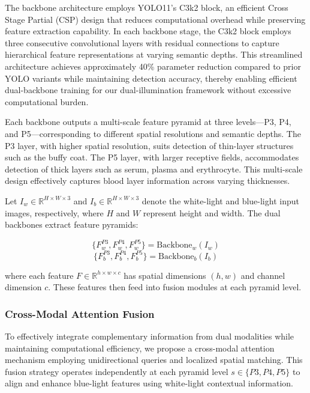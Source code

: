 The backbone architecture employs YOLO11's C3k2 block, an efficient Cross Stage Partial (CSP) design that reduces computational overhead while preserving feature extraction capability. In each backbone stage, the C3k2 block employs three consecutive convolutional layers with residual connections to capture hierarchical feature representations at varying semantic depths. This streamlined architecture achieves approximately 40\% parameter reduction compared to prior YOLO variants while maintaining detection accuracy, thereby enabling efficient dual-backbone training for our dual-illumination framework without excessive computational burden.

Each backbone outputs a multi-scale feature pyramid at three levels—P3, P4, and P5—corresponding to different spatial resolutions and semantic depths. The P3 layer, with higher spatial resolution, suits detection of thin-layer structures such as the buffy coat. The P5 layer, with larger receptive fields, accommodates detection of thick layers such as serum, plasma and erythrocyte. This multi-scale design effectively captures blood layer information across varying thicknesses.

Let $I_w \in \mathbb{R}^{H \times W \times 3}$ and $I_b \in \mathbb{R}^{H \times W \times 3}$ denote the white-light and blue-light input images, respectively, where $H$ and $W$ represent height and width. The dual backbones extract feature pyramids:

\begin{equation}
\{F_w^{P3}, F_w^{P4}, F_w^{P5}\} = \text{Backbone}_w(I_w)
\end{equation}
\begin{equation}
\{F_b^{P3}, F_b^{P4}, F_b^{P5}\} = \text{Backbone}_b(I_b)
\end{equation}

where each feature $F \in \mathbb{R}^{h \times w \times c}$ has spatial dimensions $(h, w)$ and channel dimension $c$. These features then feed into fusion modules at each pyramid level.

\subsubsection{Cross-Modal Attention Fusion}

To effectively integrate complementary information from dual modalities while maintaining computational efficiency, we propose a cross-modal attention mechanism employing unidirectional queries and localized spatial matching. This fusion strategy operates independently at each pyramid level $s \in \{P3, P4, P5\}$ to align and enhance blue-light features using white-light contextual information.


